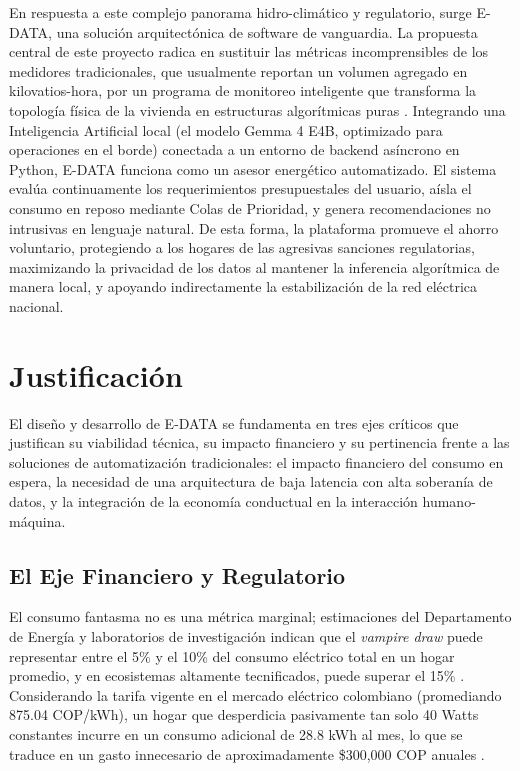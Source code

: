 \documentclass[10pt,journal,compsoc]{IEEEtran}
\begin{document}
En respuesta a este complejo panorama hidro-climático y regulatorio, surge E-DATA, una solución arquitectónica de software de vanguardia. La propuesta central de este proyecto radica en sustituir las métricas incomprensibles de los medidores tradicionales, que usualmente reportan un volumen agregado en kilovatios-hora, por un programa de monitoreo inteligente que transforma la topología física de la vivienda en estructuras algorítmicas puras \cite{xue2025}. Integrando una Inteligencia Artificial local (el modelo Gemma 4 E4B, optimizado para operaciones en el borde) conectada a un entorno de backend asíncrono en Python, E-DATA funciona como un asesor energético automatizado. El sistema evalúa continuamente los requerimientos presupuestales del usuario, aísla el consumo en reposo mediante Colas de Prioridad, y genera recomendaciones no intrusivas en lenguaje natural. De esta forma, la plataforma promueve el ahorro voluntario, protegiendo a los hogares de las agresivas sanciones regulatorias, maximizando la privacidad de los datos al mantener la inferencia algorítmica de manera local, y apoyando indirectamente la estabilización de la red eléctrica nacional.

\section{Justificación}
El diseño y desarrollo de E-DATA se fundamenta en tres ejes críticos que justifican su viabilidad técnica, su impacto financiero y su pertinencia frente a las soluciones de automatización tradicionales: el impacto financiero del consumo en espera, la necesidad de una arquitectura de baja latencia con alta soberanía de datos, y la integración de la economía conductual en la interacción humano-máquina.

\subsection{El Eje Financiero y Regulatorio}
El consumo fantasma no es una métrica marginal; estimaciones del Departamento de Energía y laboratorios de investigación indican que el \emph{vampire draw} puede representar entre el 5\% y el 10\% del consumo eléctrico total en un hogar promedio, y en ecosistemas altamente tecnificados, puede superar el 15\% \cite{dalln2016}. Considerando la tarifa vigente en el mercado eléctrico colombiano (promediando 875.04 COP/kWh), un hogar que desperdicia pasivamente tan solo 40 Watts constantes incurre en un consumo adicional de 28.8 kWh al mes, lo que se traduce en un gasto innecesario de aproximadamente \$300,000 COP anuales \cite{creg2026}.
\end{document}
